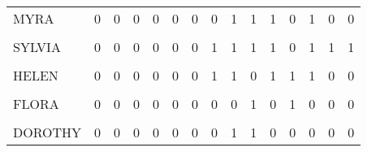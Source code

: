 \begin{table}[H]
\begin{tabular}[t]{lrrrrrrrrrrrrrr}
MYRA & 0 & 0 & 0 & 0 & 0 & 0 & 0 & 1 & 1 & 1 & 0 & 1 & 0 & 0\\
\addlinespace
\cellcolor{gray!6}{KATHERINE} & \cellcolor{gray!6}{0} & \cellcolor{gray!6}{0} & \cellcolor{gray!6}{0} & \cellcolor{gray!6}{0} & \cellcolor{gray!6}{0} & \cellcolor{gray!6}{0} & \cellcolor{gray!6}{0} & \cellcolor{gray!6}{1} & \cellcolor{gray!6}{1} & \cellcolor{gray!6}{1} & \cellcolor{gray!6}{0} & \cellcolor{gray!6}{1} & \cellcolor{gray!6}{1} & \cellcolor{gray!6}{1}\\
SYLVIA & 0 & 0 & 0 & 0 & 0 & 0 & 1 & 1 & 1 & 1 & 0 & 1 & 1 & 1\\
\cellcolor{gray!6}{NORA} & \cellcolor{gray!6}{0} & \cellcolor{gray!6}{0} & \cellcolor{gray!6}{0} & \cellcolor{gray!6}{0} & \cellcolor{gray!6}{0} & \cellcolor{gray!6}{0} & \cellcolor{gray!6}{1} & \cellcolor{gray!6}{0} & \cellcolor{gray!6}{1} & \cellcolor{gray!6}{1} & \cellcolor{gray!6}{1} & \cellcolor{gray!6}{1} & \cellcolor{gray!6}{1} & \cellcolor{gray!6}{1}\\
HELEN & 0 & 0 & 0 & 0 & 0 & 0 & 1 & 1 & 0 & 1 & 1 & 1 & 0 & 0\\
\cellcolor{gray!6}{OLIVIA} & \cellcolor{gray!6}{0} & \cellcolor{gray!6}{0} & \cellcolor{gray!6}{0} & \cellcolor{gray!6}{0} & \cellcolor{gray!6}{0} & \cellcolor{gray!6}{0} & \cellcolor{gray!6}{0} & \cellcolor{gray!6}{0} & \cellcolor{gray!6}{1} & \cellcolor{gray!6}{0} & \cellcolor{gray!6}{1} & \cellcolor{gray!6}{0} & \cellcolor{gray!6}{0} & \cellcolor{gray!6}{0}\\
\addlinespace
FLORA & 0 & 0 & 0 & 0 & 0 & 0 & 0 & 0 & 1 & 0 & 1 & 0 & 0 & 0\\
\cellcolor{gray!6}{PEARL} & \cellcolor{gray!6}{0} & \cellcolor{gray!6}{0} & \cellcolor{gray!6}{0} & \cellcolor{gray!6}{0} & \cellcolor{gray!6}{0} & \cellcolor{gray!6}{1} & \cellcolor{gray!6}{0} & \cellcolor{gray!6}{1} & \cellcolor{gray!6}{1} & \cellcolor{gray!6}{0} & \cellcolor{gray!6}{0} & \cellcolor{gray!6}{0} & \cellcolor{gray!6}{0} & \cellcolor{gray!6}{0}\\
DOROTHY & 0 & 0 & 0 & 0 & 0 & 0 & 0 & 1 & 1 & 0 & 0 & 0 & 0 & 0\\
\bottomrule
\end{tabular}
\end{table}
